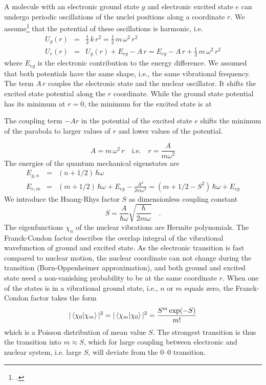 A molecule with an electronic ground state $g$ and electronic excited state $e$ can undergo periodic oscillations of the nuclei positions along a coordinate $r$. We assume\footcite{Kuzmany} that the potential of these oscillations is harmonic, i.e.
\begin{eqnarray}
 U_g(r) &=& \frac{1}{2} \, k\, r^2 = \frac{1}{2} \, m \, \omega^2 \, r^2 \\
  U_e(r) &=&  U_g(r) + E_{eg} - A \, r = E_{eg}  - A \, r + \frac{1}{2} \, m \, \omega^2 \, r^2 
 \end{eqnarray}
where $E_{eg}$ is the electronic contribution to the energy difference. We assumed that both potentials have the same shape, i.e., the same vibrational frequency. The term $A \, r$ couples the electronic state and the nuclear oscillator. It shifts the excited state potential along the $r$ coordinate. While the ground state potential has its minimum at $r=0$, the minimum for the excited state is at
%
%
\begin{marginfigure}
   
\caption{The coupling term $-A r$ in the potential of the excited state $e$ shifts the minimum of the parabola to larger values of $r$ and lower values of the potential. }
\end{marginfigure}
%
%
\begin{equation}
 A = m \, \omega^2 \,  r	 \quad \text{i.e.} \quad r = \frac{A}{m \omega^2}
\end{equation}
The energies of the quantum mechanical eigenstates are 
\begin{eqnarray}
  E_{g, n} &=&  (n + 1/2) \, \hbar \omega  \\
  E_{e, m} &=&  (m + 1/2) \, \hbar \omega  +  E_{eg} - \frac{A^2}{2 m \omega^2} =
   (m + 1/2 - S^2) \, \hbar \omega  +  E_{eg} 
\end{eqnarray}
We introduce the Huang-Rhys factor $S$ as dimensionless coupling constant
\begin{equation}
 S = \frac{A}{\hbar \omega} \sqrt{\frac{\hbar}{2 m \omega}} \quad .
\end{equation}
The eigenfunctions $\chi_n$ of the nuclear vibrations are Hermite polynomials. The Franck-Condon factor describes the overlap integral of the vibrational wavefunction of ground and excited state. As the electronic transition is fast compared to nuclear motion, the nuclear coordinate can not change during the transition (Born-Oppenheimer approximation), and both ground and excited state need a non-vanishing probability to be at the same coordinate $r$. When one of the states is in a vibrational ground state, i.e., $n$ or $m$ equals zero, the Franck-Condon factor takes the form
\begin{equation}
 | \braket{ \chi_0 | \chi_m } | ^2  =  | \braket{ \chi_m | \chi_0 } | ^2 = \frac{S^m \exp(-S)}{m!}
\end{equation}
which is a Poisson distribution of mean value $S$.  The strongest transition is thus the transition into $m \approx S$, which for large coupling between electronic and nuclear system, i.e. large $S$, will deviate from the 0--0 transition.

